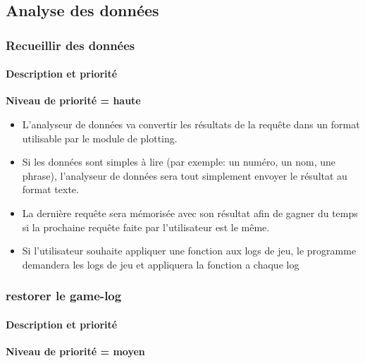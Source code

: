 \subsection{Analyse des données}
\subsubsection{Recueillir des données}
\paragraph*{Description et priorité}
\textbf{Niveau de priorité = haute}\\
\begin{itemize}

\item L'analyseur de données va convertir les résultats de la requête dans un format utilisable par le module de plotting.
\item Si les données sont simples à lire (par exemple: un numéro, un nom, une phrase), l'analyseur de données sera tout simplement envoyer le résultat au format texte.
\item La dernière requête sera mémorisée avec son résultat afin de gagner du temps si la prochaine requête faite par l'utilisateur est le même.
\item Si l'utilisateur souhaite appliquer une fonction aux logs de jeu, le programme demandera les logs de jeu et appliquera la fonction a chaque log
\end{itemize}

\subsubsection{restorer le game-log}
\paragraph*{Description et priorité}
\textbf{Niveau de priorité = moyen}\\

